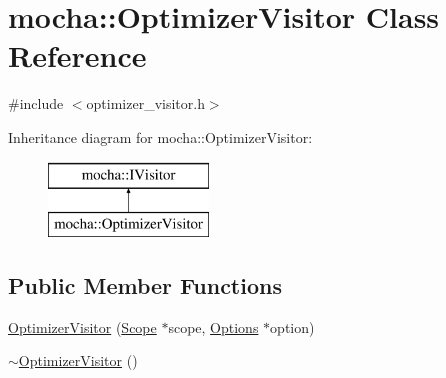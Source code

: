 \hypertarget{classmocha_1_1_optimizer_visitor}{
\section{mocha::OptimizerVisitor Class Reference}
\label{classmocha_1_1_optimizer_visitor}
}


{\ttfamily \#include $<$optimizer\_\-visitor.h$>$}

Inheritance diagram for mocha::OptimizerVisitor:\begin{figure}[H]
\begin{center}
\leavevmode
\includegraphics[height=2.000000cm]{classmocha_1_1_optimizer_visitor}
\end{center}
\end{figure}
\subsection*{Public Member Functions}
\begin{DoxyCompactItemize}
\item 
\hyperlink{classmocha_1_1_optimizer_visitor_a51c6f4f8af4ae7ce7e3c1fa6ba0b6dfa}{OptimizerVisitor} (\hyperlink{classmocha_1_1_scope}{Scope} $\ast$scope, \hyperlink{classmocha_1_1_options}{Options} $\ast$option)
\item 
\hyperlink{classmocha_1_1_optimizer_visitor_aae5a1e339db6f72763e32dd71aeea6c3}{$\sim$OptimizerVisitor} ()
\end{DoxyCompactItemize}
